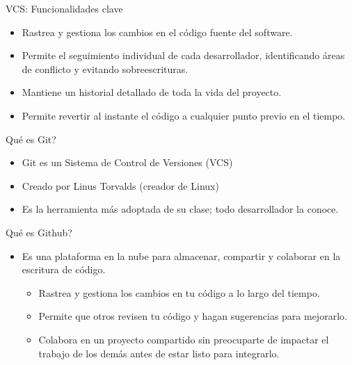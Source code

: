 \documentclass[aspectratio=43,10pt,t]{beamer}
\begin{document}

\begin{frame}{VCS: Funcionalidades clave}
  \begin{itemize}
    \item Rastrea y gestiona los cambios en el código fuente del software.
    \item Permite el seguimiento individual de cada desarrollador, identificando áreas de conflicto y evitando sobreescrituras.
    \item Mantiene un historial detallado de toda la vida del proyecto.
    \item Permite revertir al instante el código a cualquier punto previo en el tiempo.
  \end{itemize}
\end{frame}

\begin{frame}{Qué es Git?}
  \begin{itemize}
    \item Git es un Sistema de Control de Versiones (VCS)
    \item Creado por Linus Torvalds (creador de Linux)
    \item Es la herramienta más adoptada de su clase; todo desarrollador la conoce.
  \end{itemize}
\end{frame}

\begin{frame}{Qué es Github?}
  \begin{itemize}
    \item Es una plataforma en la nube para almacenar, compartir y colaborar en la escritura de código.
    \begin{itemize}
      \item Rastrea y gestiona los cambios en tu código a lo largo del tiempo.
      \item Permite que otros revisen tu código y hagan sugerencias para mejorarlo.
      \item Colabora en un proyecto compartido sin preocuparte de impactar el trabajo de los demás antes de estar listo para integrarlo.
    \end{itemize}
  \end{itemize}
    {}
\end{frame}
\end{document}
